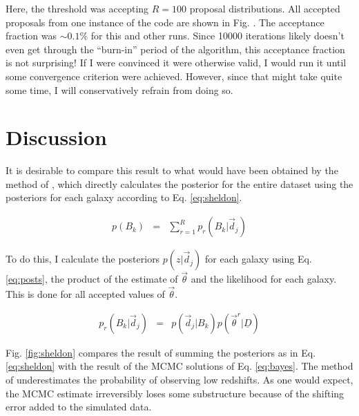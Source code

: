 \documentclass[12pt, onecolumn]{emulateapj}
\newcommand{\textul}{\underline}
\begin{document}
Here, the threshold was accepting $R=100$ proposal distributions.  All accepted proposals from one instance of the code are shown in Fig. %
.  The acceptance fraction was $\sim0.1\%$ for this and other runs.  Since 10000 iterations likely doesn't even get through the ``burn-in'' period of the algorithm, this acceptance fraction is not surprising!  If I were convinced it were otherwise valid, I would run it until some convergence criterion were achieved.  However, since that might take quite some time, I will conservatively refrain from doing so.


\section{Discussion}

It is desirable to compare this result to what would have been obtained by the method of \citet{she11}, which directly calculates the posterior for the entire dataset using the posteriors for each galaxy according to Eq. \ref{eq:sheldon}.

\begin{eqnarray}
\label{eq:sheldon}
p(B_{k}) &=& \sum_{r=1}^{R}p_{r}(B_{k}|\vec{d}_{j})
\end{eqnarray}

To do this, I calculate the posteriors $p(z|\vec{d}_{j})$ for each galaxy using Eq. \ref{eq:posts}, the product of the estimate of $\vec{\theta}$ and the likelihood for each galaxy.  This is done for all accepted values of $\vec{\theta}$.

\begin{eqnarray}
\label{eq:posts}
p_{r}(B_{k}|\vec{d}_{j}) &=& p(\vec{d}_{j}|B_{k})p(\vec{\theta}^{r}|\textul{D})
\end{eqnarray}

Fig. \ref{fig:sheldon} compares the result of summing the posteriors as in Eq. \ref{eq:sheldon} with the result of the MCMC solutions of Eq. \ref{eq:bayes}.  The method of \citet{she11} underestimates the probability of observing low redshifts.  As one would expect, the MCMC estimate irreversibly loses some substructure because of the shifting error added to the simulated data.
\end{document}
